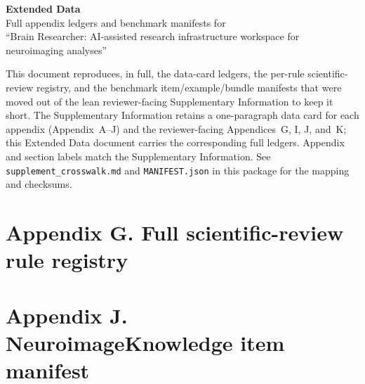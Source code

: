 \documentclass[pdflatex,sn-mathphys-num]{sn-jnl}
\begin{document}
\setcounter{secnumdepth}{0}

\begin{center}
{\LARGE\bfseries Extended Data}\\[0.4em]
{\large Full appendix ledgers and benchmark manifests for\\[0.2em]
``Brain Researcher: AI-assisted research infrastructure workspace for neuroimaging analyses''}
\end{center}
\vspace{1.2em}

\noindent This document reproduces, in full, the data-card ledgers, the per-rule
scientific-review registry, and the benchmark item/example/bundle manifests that
were moved out of the lean reviewer-facing Supplementary Information to keep it
short. The Supplementary Information retains a one-paragraph data card for each
appendix (Appendix~A--J) and the reviewer-facing Appendices~G, I, J, and~K; this
Extended Data document carries the corresponding full ledgers. Appendix and
section labels match the Supplementary Information. See \texttt{supplement\_crosswalk.md}
and \texttt{MANIFEST.json} in this package for the mapping and checksums.
\vspace{0.5em}

\tableofcontents
\clearpage


\clearpage

\clearpage

\clearpage

\clearpage

\clearpage

\clearpage
\section{\texorpdfstring{\textbf{Appendix G. Full scientific-review rule registry}}{Appendix G. Full scientific-review rule registry}}

\clearpage

\clearpage
\section{\texorpdfstring{\textbf{Appendix J. NeuroimageKnowledge item manifest}}{Appendix J. NeuroimageKnowledge item manifest}}

\clearpage
\end{document}
